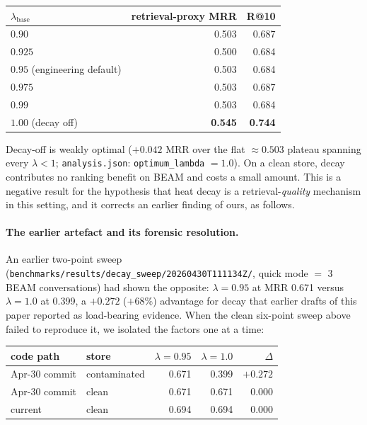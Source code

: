 \documentclass[11pt]{article}
\begin{document}
\begin{center}
\small
\begin{tabular}{lrr}
\toprule
$\lambda_{\mathrm{base}}$ & retrieval-proxy MRR & R@10 \\
\midrule
$0.90$  & 0.503 & 0.687 \\
$0.925$ & 0.500 & 0.684 \\
$0.95$ (engineering default) & 0.503 & 0.684 \\
$0.975$ & 0.503 & 0.687 \\
$0.99$  & 0.503 & 0.684 \\
$1.00$ (decay off) & \textbf{0.545} & \textbf{0.744} \\
\bottomrule
\end{tabular}
\end{center}

Decay-off is weakly optimal ($+0.042$ MRR over the flat
$\approx 0.503$ plateau spanning every $\lambda < 1$;
\texttt{analysis.json}: \texttt{optimum\_lambda} $= 1.0$).  On a
clean store, decay contributes no ranking benefit on BEAM and costs
a small amount.  This is a negative result for the hypothesis that
heat decay is a retrieval-\emph{quality} mechanism in this setting,
and it corrects an earlier finding of ours, as follows.

\paragraph{The earlier artefact and its forensic resolution.}
An earlier two-point sweep
(\texttt{benchmarks/results/decay\_sweep/20260430T111134Z/}, quick
mode $=$ 3 BEAM conversations) had shown the opposite: $\lambda =
0.95$ at MRR 0.671 versus $\lambda = 1.0$ at 0.399, a $+0.272$
($+68\%$) advantage for decay that earlier drafts of this paper
reported as load-bearing evidence.  When the clean six-point sweep
above failed to reproduce it, we isolated the factors one at a time:

\begin{center}
\small
\begin{tabular}{llrrr}
\toprule
code path & store & $\lambda{=}0.95$ & $\lambda{=}1.0$ & $\Delta$ \\
\midrule
Apr-30 commit & contaminated & 0.671 & 0.399 & $+0.272$ \\
Apr-30 commit & clean        & 0.671 & 0.671 & $0.000$ \\
current       & clean        & 0.694 & 0.694 & $0.000$ \\
\bottomrule
\end{tabular}
\end{center}
\end{document}
